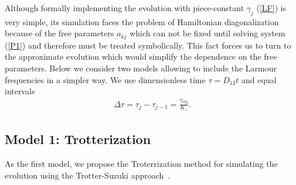 \documentclass[pra,preprint,showpacs]{revtex4-1}
\begin{document}
Although  formally  implementing  the evolution with  piece-constant $\gamma_j$  (\ref{LF}) is very simple,
its simulation faces the problem of  Hamiltonian diagonalization because of the free parameters $a_{kj}$ which can not be fixed until solving system (\ref{P1}) {and therefore must be treated symbolically}. This fact  forces us to turn to the approximate evolution which would simplify the dependence on the free parameters.
Below we consider two models allowing to include the Larmour frequencies in a simpler way. We use dimensionless time $\tau = D_{12} t$ and equal intervals
\begin{eqnarray}\label{dtau}
\Delta\tau = \tau_j-\tau_{j-1} ={ \frac{\tau_{\mathrm{reg}}}{K_\gamma}.}
\end{eqnarray}

\subsection{Model 1: Trotterization}
\label{Section:Trot}
As the first model, we propose the Troterrization method for simulating the evolution using the Trotter-Suzuki approach~\cite{Trotter,Suzuki}.
\end{document}
